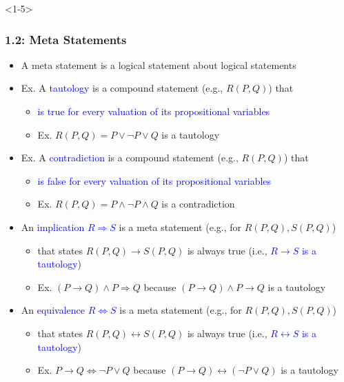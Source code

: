 \documentclass[10pt,english,aspectratio=169]{beamer}
\begin{document}
\begin{frame}<1-5> \frametitle{1.2: Meta Statements}

\begin{itemize}
\setlength\itemsep{2mm}
\item<1-> A meta statement is a logical statement about logical statements


\item<2-> Ex. A \textcolor{blue}{tautology} is a compound statement (e.g., $R(P,Q)$) that \vspace{1mm}
\begin{itemize}
 \setlength\itemsep{1.5mm}
 \item \textcolor{blue}{is true for every valuation of its propositional variables}
 \item Ex. $R(P,Q) = P \vee \neg P \vee Q$ is a tautology
\end{itemize}

\vspace{1mm}

\item<3-> Ex. A \textcolor{blue}{contradiction} is a compound statement (e.g., $R(P,Q)$) that \vspace{1mm}
\begin{itemize}
  \setlength\itemsep{1.5mm}
 \item  \textcolor{blue}{is false for every valuation of its propositional variables}
 \item Ex. $R(P,Q) = P \wedge \neg P \wedge Q$ is a contradiction
\end{itemize}

\vspace{1mm}

\item<4-> An \textcolor{blue}{implication $R \Rightarrow S$} is a meta statement (e.g., for $R(P,Q),S(P,Q)$) \vspace{1mm}
\begin{itemize}
  \setlength\itemsep{1.5mm}
 \item that states $R(P,Q) \rightarrow S(P,Q)$ is always true (i.e., \textcolor{blue}{$R \rightarrow S$ is a tautology})
 \item Ex. $(P \rightarrow Q) \wedge P \Rightarrow Q$ because $(P \rightarrow Q) \wedge P \rightarrow Q$ is a tautology
\end{itemize}

\item<5-> An \textcolor{blue}{equivalence $R \Leftrightarrow S$} is a meta statement (e.g., for $R(P,Q),S(P,Q)$) \vspace{1mm}
\begin{itemize}
  \setlength\itemsep{1.5mm}
 \item that states $R(P,Q) \leftrightarrow S(P,Q)$ is always true (i.e., \textcolor{blue}{$R \leftrightarrow S$ is a tautology})
 \item Ex. $P \rightarrow Q \Leftrightarrow \neg P \vee Q$ because $(P \rightarrow Q) \leftrightarrow (\neg P \vee Q)$ is a tautology
\end{itemize}


\end{itemize}
\end{frame}
\end{document}
